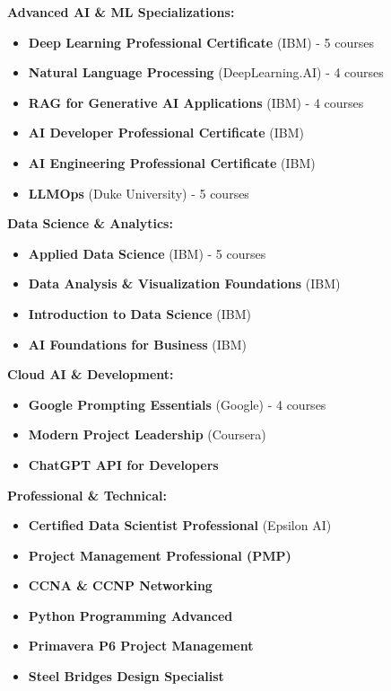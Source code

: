 \documentclass[10pt, letterpaper]{article}
\begin{document}
\begin{tcolorbox}[enhanced, frame hidden,
    left=8pt, right=8pt, top=3pt, bottom=8pt,
    colback=lightGray!20]

\begin{minipage}{0.48\textwidth}
\textbf{\textcolor{primaryColor}{Advanced AI \& ML Specializations:}}
\begin{itemize}[leftmargin=0.3cm, itemsep=0.1ex, topsep=0.2ex]
    \item \textbf{Deep Learning Professional Certificate} (IBM) - 5 courses
    \item \textbf{Natural Language Processing} (DeepLearning.AI) - 4 courses
    \item \textbf{RAG for Generative AI Applications} (IBM) - 4 courses
    \item \textbf{AI Developer Professional Certificate} (IBM)
    \item \textbf{AI Engineering Professional Certificate} (IBM)
    \item \textbf{LLMOps} (Duke University) - 5 courses
\end{itemize}

\textbf{\textcolor{primaryColor}{Data Science \& Analytics:}}
\begin{itemize}[leftmargin=0.3cm, itemsep=0.1ex, topsep=0.2ex]
    \item \textbf{Applied Data Science} (IBM) - 5 courses
    \item \textbf{Data Analysis \& Visualization Foundations} (IBM)
    \item \textbf{Introduction to Data Science} (IBM)
    \item \textbf{AI Foundations for Business} (IBM)
\end{itemize}
\end{minipage}
\hfill
\begin{minipage}{0.48\textwidth}
\textbf{\textcolor{primaryColor}{Cloud AI \& Development:}}
\begin{itemize}[leftmargin=0.3cm, itemsep=0.1ex, topsep=0.2ex]
    \item \textbf{Google Prompting Essentials} (Google) - 4 courses
    \item \textbf{Modern Project Leadership} (Coursera)
    \item \textbf{ChatGPT API for Developers}
\end{itemize}

\textbf{\textcolor{primaryColor}{Professional \& Technical:}}
\begin{itemize}[leftmargin=0.3cm, itemsep=0.1ex, topsep=0.2ex]
    \item \textbf{Certified Data Scientist Professional} (Epsilon AI)
    \item \textbf{Project Management Professional (PMP)}
    \item \textbf{CCNA \& CCNP Networking}
    \item \textbf{Python Programming Advanced}
    \item \textbf{Primavera P6 Project Management}
    \item \textbf{Steel Bridges Design Specialist}
\end{itemize}


\end{minipage}
\end{tcolorbox}
\end{document}
